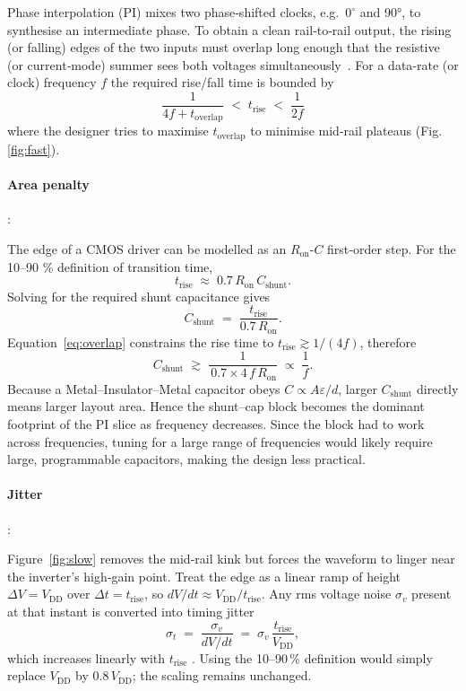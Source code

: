Phase interpolation (PI) mixes two phase‑shifted clocks, e.g.\ $0^{\circ}$ and
\ang{90}, to synthesise an intermediate phase.  To obtain a clean
rail‑to‑rail output, the rising (or falling) edges of the two inputs must
overlap long enough that the resistive (or current‑mode) summer sees
both voltages simultaneously \cite{Razavi2023PI}.  For a data‑rate (or clock)
frequency $f$ the required rise/fall time is bounded by
%
\begin{equation}
{\;
     \frac{1}{4f+t_{\text{overlap}}} 
     \;<\; t_{\text{rise}} 
     \;<\; \frac{1}{2f}
     \;}
\label{eq:overlap}
\end{equation}
%
where the designer tries to maximise $t_{\text{overlap}}$ to minimise
mid‑rail plateaus (Fig.\,\ref{fig:fast}).

\paragraph{Area penalty}:

The edge of a CMOS driver can be modelled as an \(R_{\text{on}}\)-\(C\) first‑order step.  
For the 10--90 \% definition of transition time,
\[
  t_{\text{rise}}\;\approx\;0.7\,R_{\text{on}}\,C_{\text{shunt}}.
\]
Solving for the required shunt capacitance gives  
\[
  C_{\text{shunt}} \;=\; \frac{t_{\text{rise}}}{0.7\,R_{\text{on}}}.
  \label{eq:C_shunt_area}
\]
Equation~\eqref{eq:overlap} constrains the rise time to
\(t_{\text{rise}}\gtrsim 1/(4f)\), therefore  
\[
  C_{\text{shunt}}
  \;\gtrsim\; 
  \frac{1}{\,0.7 \times 4\,f\,R_{\text{on}}}
  \;\propto\;\frac{1}{f}.
  \label{eq:C_shunt}
\]
Because a Metal–Insulator–Metal capacitor obeys \(C\propto A\varepsilon/d\),
larger \(C_{\text{shunt}}\) directly means larger layout area.  
Hence the shunt–cap block becomes the dominant footprint of the PI slice as frequency decreases. 
Since the block had to work across frequencies, tuning for a large range of frequencies would likely require large, programmable capacitors, making the design less practical.

\paragraph{Jitter}:

Figure~\ref{fig:slow} removes the mid‑rail kink but forces the waveform to
linger near the inverter’s high‑gain point.  Treat the edge as a linear ramp
of height \(\Delta V = V_{\text{DD}}\) over
\(\Delta t = t_{\text{rise}}\), so
\(dV/dt \approx V_{\text{DD}}/t_{\text{rise}}\).
Any rms voltage noise \(\sigma_v\) present at that instant is converted into
timing jitter
\[
  \sigma_t
  \;=\;
  \frac{\sigma_v}{dV/dt}
  \;=\;
  \sigma_v \,\frac{t_{\text{rise}}}{V_{\text{DD}}},
\]
which increases linearly with \(t_{\text{rise}}\)
\cite{TektronixJitterPrimer2012}.  Using the 10--90\,\% definition would simply
replace \(V_{\text{DD}}\) by \(0.8\,V_{\text{DD}}\); the scaling remains
unchanged.

